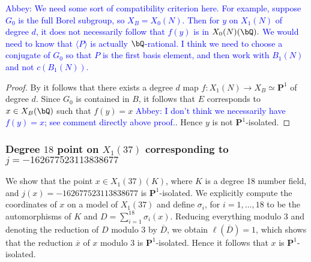 \documentclass[11pt,reqno]{amsart}
\theoremstyle{plain}
\theoremstyle{definition}
\newcommand{\Q}{\bQ}
\newcommand{\PP}{\mathbf P}
\newcommand{\filip}[1]{{\textcolor{cyan}{Filip: [#1]}}}
\newcommand{\abbey}[1]{\textcolor{blue}{Abbey: #1}}
\newcommand{\sachi}[1]{\textcolor{purple}{Sachi: #1}}
\begin{document}
\abbey{We need some sort of compatibility criterion here. For example, suppose $G_0$ is the full Borel subgroup, so $X_B=X_0(N)$. Then for $y$ on $X_1(N)$ of degree $d$, it does not necessarily follow that $f(y)$ is in $X_0(N)(\Q).$ We would need to know that $\langle P \rangle$ is actually $\Q$-rational. I think we need to choose a conjugate of $G_0$ so that $P$ is the first basis element, and then work with $B_1(N)$ and not $c(B_1(N))$.}

\begin{proof}
    By  it follows that there exists a degree $d$ map $f\colon X_1(N)\rightarrow X_B\simeq \PP^1$ of degree $d$. Since $G_0$ is contained in $B$, it follows that $E$ corresponds to  $x\in X_B(\Q)$ such that $f(y)=x$ \abbey{I don't think we necessarily have $f(y)=x$; see comment directly above proof.}. Hence $y$ is not $\PP^1$-isolated.
\end{proof}

\fi


\subsubsection{Degree $18$ point on $X_1(37)$ corresponding to $j=-162677523113838677$}

We show that the point $x\in X_1(37)(K)$, where $K$ is a degree 18 number field, and $j(x)=-162677523113838677$ is $\PP^1$-isolated. We explicitly compute the coordinates of $x$ on a model of $X_1(37)$ and define  $\sigma_i$, for $i=1,\ldots, 18$ to be the automorphisms of $K$ and $D=\sum_{i=1}^{18}\sigma_i(x)$. Reducing everything modulo $3$ and denoting the reduction of $D$ modulo $3$ by $\overline{D}$, we obtain $\ell(\overline{D})=1$, which shows that the reduction
$\overline{x}$ of $x$ modulo 3 is $\PP^1$-isolated. Hence it follows that $x$ is $\PP^1$-isolated.  %
\end{document}
